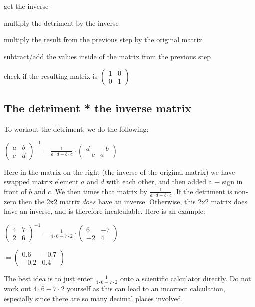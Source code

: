 \documentclass[options]{article}
\begin{document}
\begin{steps}
    \item get the inverse
    \item multiply the detriment by the inverse
    \item multiply the result from the previous step by the original matrix
    \item subtract/add the values inside of the matrix from the previous step
    \item check if the resulting matrix is \( \begin{pmatrix} 1 & 0\\0 & 1 \end{pmatrix} \)
\end{steps}

\subsection{The detriment * the inverse matrix}
To workout the detriment, we do the following:
\begin{center}
    \(
        \begin{pmatrix}
            a & b\\
            c & d
        \end{pmatrix}
        ^{-1} 
        =
        \frac{1}{a \cdot d - b \cdot c}
        \cdot
        \begin{pmatrix}
            d & -b\\
            -c & a
        \end{pmatrix}
    \)
\end{center}
Here in the matrix on the right (the inverse of the original matrix) we have swapped matrix element \(a\) and \(d\) with each other, and then added a \(-\) sign in front of \(b\) and \(c\). 
We then times that matrix by \( \frac{1}{{a \cdot d - b \cdot c}} \). If the detriment is non-zero then the 2x2 matrix \(\textit{does}\) have an inverse. Otherwise, this 2x2 matrix does have an inverse,
and is therefore incalculable. Here is an example:
\begin{center}
    \(
        \begin{pmatrix}
            4 & 7\\
            2 & 6
        \end{pmatrix}
        ^{-1} 
        =
        \frac{1}{4 \cdot 6 - 7 \cdot 2}
        \cdot
        \begin{pmatrix}
            6 & -7\\
            -2 & 4
        \end{pmatrix}
    \)

    \(
        =
        \begin{pmatrix}
            0.6 & -0.7\\
            -0.2 & 0.4
        \end{pmatrix}
    \)
\end{center}
The best idea is to just enter \(\frac{1}{4 \cdot 6 - 7 \cdot 2}\) onto a scientific calculator directly. Do not work out
\( 4 \cdot 6 - 7 \cdot 2 \) yourself as this can lead to an incorrect calculation, especially since there are so many decimal places involved. 
\end{document}

